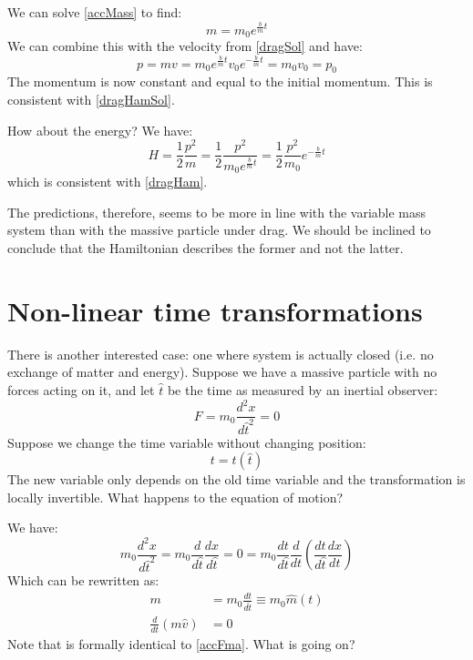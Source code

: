 \documentclass[aps,pra,10pt,twocolumn,floatfix,nofootinbib]{revtex4-1}
\theoremstyle{definition}
\begin{document}
We can solve \eqref{accMass} to find:
\begin{equation}
\label{accMassSol}
m = m_0 e^{\frac{b}{m} t}
\end{equation}
We can combine this with the velocity from \eqref{dragSol} and have:
\begin{equation}
p = m v = m_0 e^{\frac{b}{m} t} v_0 e^{-\frac{b}{m}t} = m_0 v_0 = p_0
\end{equation}
The momentum is now constant and equal to the initial momentum. This is consistent with \eqref{dragHamSol}.

How about the energy? We have:
\begin{equation}
H = \frac{1}{2} \frac{p^2}{m} = \frac{1}{2} \frac{p^2}{m_0 e^{\frac{b}{m} t}} = \frac{1}{2} \frac{p^2}{m_0} e^{-\frac{b}{m} t}
\end{equation}
which is consistent with \eqref{dragHam}.

The predictions, therefore, seems to be more in line with the variable mass system than with the massive particle under drag. We should be inclined to conclude that the Hamiltonian describes the former and not the latter.

\section{Non-linear time transformations}

There is another interested case: one where system is actually closed (i.e. no exchange of matter and energy). Suppose we have a massive particle with no forces acting on it, and let $\hat{t}$ be the time as measured by an inertial observer:
\begin{equation*}
F=m_0\frac{d^2x}{d\hat{t}^2}=0
\end{equation*}
Suppose we change the time variable without changing position:
\begin{equation}
t=t(\hat{t})
\end{equation}
The new variable only depends on the old time variable and the transformation is locally invertible. What happens to the equation of motion?

We have:
\begin{equation*}
m_0\frac{d^2x}{d\hat{t}^2}= m_0 \frac{d}{d\hat{t}} \frac{dx}{d\hat{t}} =0 = m_0 \frac{dt}{d\hat{t}}\frac{d}{dt} (\frac{dt}{d\hat{t}}\frac{dx}{dt})
\end{equation*}
Which can be rewritten as:
\begin{equation}
\begin{aligned}
m &= m_0 \frac{dt}{d\hat{t}} \equiv m_0 \hat{m}(t) \\
\frac{d}{dt} (m\hat{v}) &= 0
\end{aligned}
\label{transMass}
\end{equation}
Note that is formally identical to \eqref{accFma}. What is going on?
\end{document}
